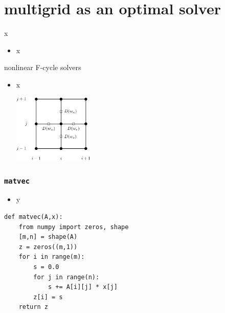 \documentclass[10pt,
               svgnames,
               hyperref={colorlinks,citecolor=DeepPink4,linkcolor=FireBrick,urlcolor=Maroon},
               usepdftitle=false]{beamer}
\begin{document}
\section{multigrid as an optimal solver}

\begin{frame}{x}
\begin{itemize}
\item x
\end{itemize}
\end{frame}

\begin{frame}{nonlinear F-cycle solvers}
\begin{itemize}
\item x

\hfill \includegraphics[width=0.3\textwidth]{images/msboxstencil.png}
\end{itemize}
\end{frame}


\begin{frame}[fragile]
\frametitle{\texttt{matvec}}
\begin{itemize}
\item y
\end{itemize}
\begin{center}
\begin{minipage}{0.7\textwidth}
\begin{verbatim}
def matvec(A,x):
    from numpy import zeros, shape
    [m,n] = shape(A)
    z = zeros((m,1))
    for i in range(m):
        s = 0.0
        for j in range(n):
            s += A[i][j] * x[j]
        z[i] = s
    return z
\end{verbatim}
\end{minipage}
\end{center}
\end{frame}
\end{document}
